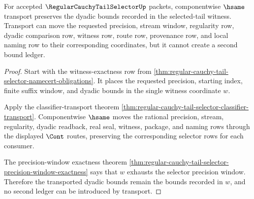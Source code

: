\begin{theorem}
\label{thm:regular-cauchy-tail-selector-transported-bound-preservation}
For accepted $\RegularCauchyTailSelectorUp$ packets, componentwise $\hsame$ transport preserves the dyadic bounds recorded in the selected-tail witness. Transport can move the requested precision, stream window, regularity row, dyadic comparison row, witness row, route row, provenance row, and local naming row to their corresponding coordinates, but it cannot create a second bound ledger.
\end{theorem}
\begin{proof}
Start with the witness-exactness row from \autoref{thm:regular-cauchy-tail-selector-namecert-obligations}. It places the requested precision, starting index, finite suffix window, and dyadic bounds in the single witness coordinate $w$.

Apply the classifier-transport theorem \autoref{thm:regular-cauchy-tail-selector-classifier-transport}. Componentwise $\hsame$ moves the rational precision, stream, regularity, dyadic readback, real seal, witness, package, and naming rows through the displayed $\Cont$ routes, preserving the corresponding selector rows for each consumer.

The precision-window exactness theorem \autoref{thm:regular-cauchy-tail-selector-precision-window-exactness} says that $w$ exhausts the selector precision window. Therefore the transported dyadic bounds remain the bounds recorded in $w$, and no second ledger can be introduced by transport.
\end{proof}

